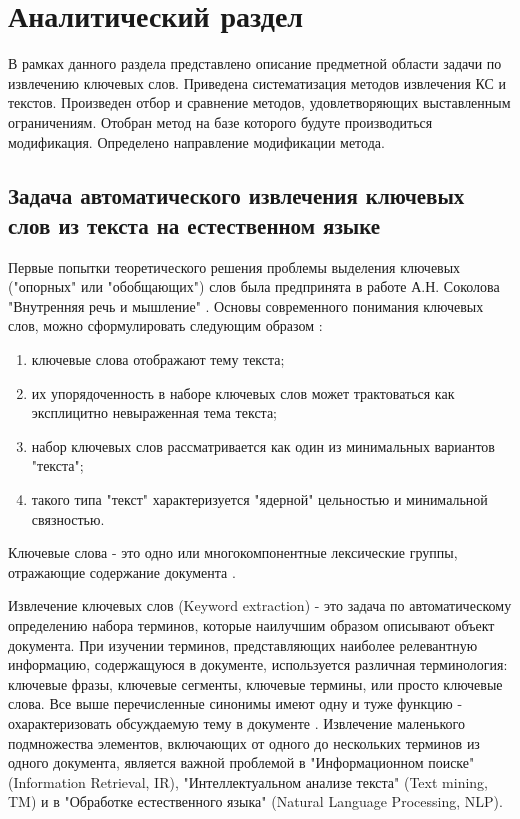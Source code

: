 \chapter{Аналитический раздел}
В рамках данного раздела представлено описание предметной области задачи по извлечению ключевых слов. 
Приведена систематизация методов извлечения КС и текстов.
Произведен отбор и сравнение методов, удовлетворяющих выставленным ограничениям.
Отобран метод на базе которого будуте производиться модификация.
Определено направление модификации метода.

\section{Задача автоматического извлечения ключевых слов из текста на естественном языке}

Первые попытки теоретического решения проблемы выделения ключевых ("опорных" или "обобщающих") слов была предпринята в работе А.Н. Соколова "Внутренняя речь и мышление" \cite{6}.
Основы современного понимания ключевых слов, можно сформулировать следующим образом \cite{7}:
\begin{enumerate}
	\item ключевые слова отображают тему текста;
	\item их упорядоченность в наборе ключевых слов может трактоваться как эксплицитно невыраженная тема текста;
	\item набор ключевых слов рассматривается как один из минимальных вариантов "текста";
	\item такого типа "текст" характеризуется "ядерной" цельностью и минимальной связностью.
\end{enumerate}

Ключевые слова - это одно или многокомпонентные лексические группы, отражающие содержание документа \cite{3}.

Извлечение ключевых слов (Keyword extraction) - это задача по автоматическому определению набора терминов, которые наилучшим образом описывают объект документа.
При изучении терминов, представляющих наиболее релевантную информацию, содержащуюся в документе, используется различная терминология: ключевые фразы, ключевые сегменты, ключевые термины, или просто ключевые слова.
Все выше перечисленные синонимы имеют одну и туже функцию - охарактеризовать обсуждаемую тему в документе \cite{4}.
Извлечение маленького подмножества элементов, включающих от одного до нескольких терминов из одного документа, является важной проблемой в "Информационном поиске" (Information Retrieval, IR), "Интеллектуальном анализе текста" (Text mining, TM) и в "Обработке естественного языка" (Natural Language Processing, NLP).

